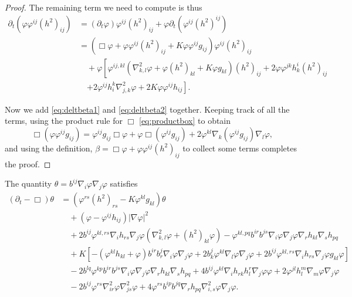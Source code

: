 \documentclass{amsart}
\begin{document}
\begin{proof}
The remaining term we need to compute is thus
\begin{equation}
\label{eq:deltbeta2}
\begin{split}
\partial_{t} (\varphi \varphi^{ij}(h^2)_{ij}) &= (\partial_{t} \varphi) \varphi^{ij}(h^2)_{ij} + \varphi \partial_t (\varphi^{ij} (h^2)^{ij}) \\
&= (\Box \varphi + \varphi\varphi^{ij}(h^2)_{ij} + K \varphi\varphi^{ij}g_{ij}) \varphi^{ij}(h^2)_{ij} \\
&\quad + \varphi \left[\varphi^{ij,kl} \left(\nabla^2_{k,l} \varphi + \varphi(h^2)_{kl} + K \varphi g_{kl}\right)(h^2)_{ij} + 2\varphi\varphi^{jk}h^{i}_{k} (h^2)_{ij} \right.\\
&\quad \left. + 2 \varphi^{ij} h^k_i \nabla^2_{j,k} \varphi  + 2K\varphi\varphi^{ij}h_{ij}\right].
\end{split}
\end{equation}

Now we add \cref{eq:deltbeta1} and \cref{eq:deltbeta2} together. Keeping track of all the terms, using the product rule for \(\Box\) \cref{eq:productbox} to obtain
\[
\Box(\varphi \varphi^{ij} g_{ij}) = \varphi^{ij} g_{ij} \Box \varphi + \varphi \Box (\varphi^{ij} g_{ij}) + 2 \varphi^{kl} \nabla_k (\varphi^{ij} g_{ij}) \nabla_l \varphi,
\]
and using the definition, \(\beta = \Box\varphi +  \varphi\varphi^{ij} (h^2)_{ij}\) to collect some terms completes the proof.
\end{proof}

\begin{lemma}
\label{lem:Evtheta}
The quantity $\theta = b^{ij}\nabla_i \varphi\nabla_j\varphi$ satisfies
\[
\begin{split}
(\partial_{t} - \Box)\theta &= (\varphi^{rs}(h^2)_{rs} - K\varphi^{kl}g_{kl})\theta \\
&\quad + (\varphi - \varphi^{ij}h_{ij})|\nabla\varphi|^{2} \\
&\quad + 2b^{ij}\varphi^{kl,rs}\nabla_i h_{rs}\nabla_j\varphi (\nabla^2_{k,l} \varphi + (h^2)_{kl}\varphi) - \varphi^{kl,pq}b^{ir}b^{js}\nabla_i \varphi\nabla_j\varphi \nabla_r h_{kl} \nabla_s h_{pq} \\
&\quad + K\left[-(\varphi^{kl}h_{kl} + \varphi)b^{ir}b^{j}_{r}\nabla_i \varphi\nabla_j\varphi + 2 b^{j}_{k}\varphi^{kl}\nabla_l\varphi\nabla_j\varphi + 2 b^{ij}\varphi^{kl,rs}\nabla_i h_{rs}\nabla_j\varphi g_{kl}\varphi\right] \\
&\quad - 2b^{lq}\varphi^{kp} b^{ir}b^{js}\nabla_i \varphi\nabla_j\varphi \nabla_r h_{kl} \nabla_s h_{pq} + 4b^{ij}\varphi^{kl}\nabla_i h_{rk}h^{r}_{l}\nabla_j \varphi\varphi + 2\varphi^{jl}h^{m}_{l}\nabla_m\varphi\nabla_j\varphi \\
&\quad - 2b^{ij}\varphi^{rs}\nabla^2_{ir}\varphi\nabla^2_{js}\varphi + 4\varphi^{rs}b^{ip}b^{jq}\nabla_r h_{pq}\nabla^2_{i,s} \varphi \nabla_j\varphi.
\end{split}
\]
\end{lemma}
\end{document}
